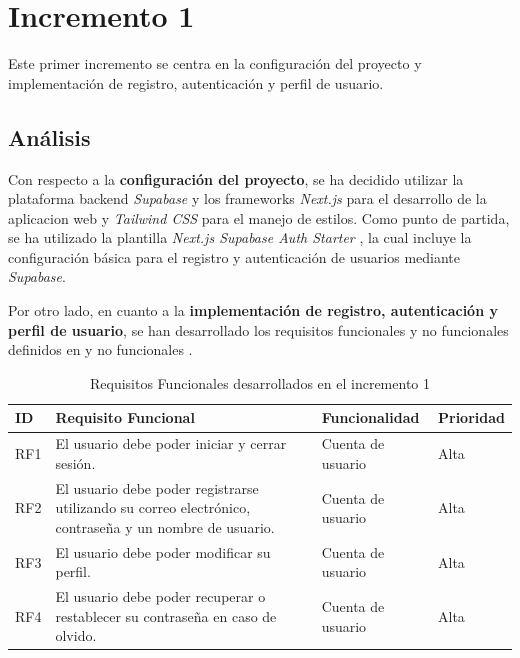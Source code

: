 \section{Incremento 1}
Este primer incremento se centra en la configuración del proyecto y implementación de registro, autenticación y perfil de usuario.

\subsection{Análisis}
Con respecto a la \textbf{configuración del proyecto}, se ha decidido utilizar la plataforma backend \emph{Supabase} y los frameworks \emph{Next.js} para el desarrollo de la aplicacion web y \textit{Tailwind CSS} para el manejo de estilos. Como punto de partida, se ha utilizado la plantilla \emph{Next.js Supabase Auth Starter} \cite{nextjs_supabase_starter}, la cual incluye la configuración básica para el registro y autenticación de usuarios mediante \emph{Supabase}.

Por otro lado, en cuanto a la \textbf{implementación de registro, autenticación y perfil de usuario}, se han desarrollado los requisitos funcionales y no funcionales definidos en  y no funcionales .

\begin{table}[H]
    \centering
    \scriptsize
    \begin{tabular}{l p{} p{} l}
        \textbf{ID} & \textbf{Requisito Funcional} & \textbf{Funcionalidad} & \textbf{Prioridad} \\ \hline
        RF1  & El usuario debe poder iniciar y cerrar sesión. & Cuenta de usuario & Alta \\ \hline
        RF2  & El usuario debe poder registrarse utilizando su correo electrónico, contraseña y un nombre de usuario. & Cuenta de usuario & Alta \\ \hline
        RF3  & El usuario debe poder modificar su perfil. & Cuenta de usuario & Alta \\ \hline
        RF4  & El usuario debe poder recuperar o restablecer su contraseña en caso de olvido. & Cuenta de usuario & Alta \\ \hline
    \end{tabular}
    \caption{Requisitos Funcionales desarrollados en el incremento 1}\label{tab:requisitosfuncionalesincremento1}
\end{table}


